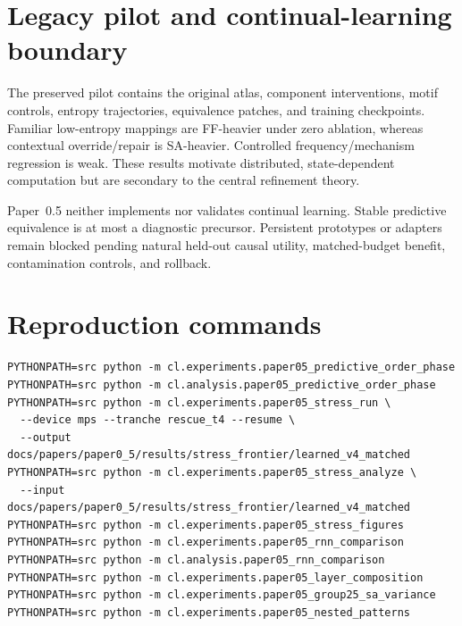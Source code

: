 \section{Legacy pilot and continual-learning boundary}
The preserved pilot contains the original atlas, component interventions, motif controls, entropy trajectories, equivalence patches, and training checkpoints. Familiar low-entropy mappings are FF-heavier under zero ablation, whereas contextual override/repair is SA-heavier. Controlled frequency/mechanism regression is weak. These results motivate distributed, state-dependent computation but are secondary to the central refinement theory.

Paper~0.5 neither implements nor validates continual learning. Stable predictive equivalence is at most a diagnostic precursor. Persistent prototypes or adapters remain blocked pending natural held-out causal utility, matched-budget benefit, contamination controls, and rollback.

\section{Reproduction commands}
\begin{verbatim}
PYTHONPATH=src python -m cl.experiments.paper05_predictive_order_phase
PYTHONPATH=src python -m cl.analysis.paper05_predictive_order_phase
PYTHONPATH=src python -m cl.experiments.paper05_stress_run \
  --device mps --tranche rescue_t4 --resume \
  --output docs/papers/paper0_5/results/stress_frontier/learned_v4_matched
PYTHONPATH=src python -m cl.experiments.paper05_stress_analyze \
  --input docs/papers/paper0_5/results/stress_frontier/learned_v4_matched
PYTHONPATH=src python -m cl.experiments.paper05_stress_figures
PYTHONPATH=src python -m cl.experiments.paper05_rnn_comparison
PYTHONPATH=src python -m cl.analysis.paper05_rnn_comparison
PYTHONPATH=src python -m cl.experiments.paper05_layer_composition
PYTHONPATH=src python -m cl.experiments.paper05_group25_sa_variance
PYTHONPATH=src python -m cl.experiments.paper05_nested_patterns
\end{verbatim}

